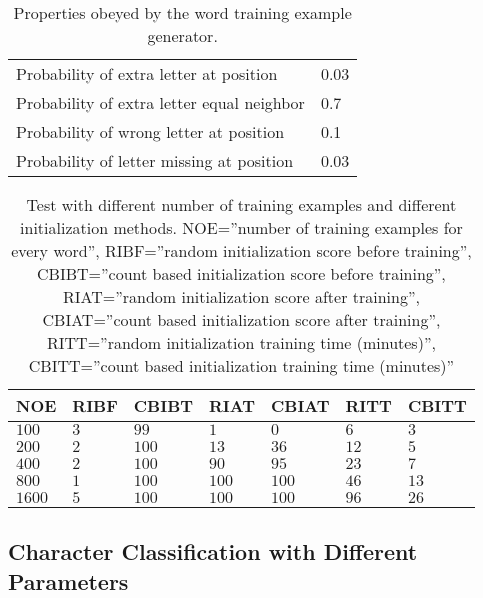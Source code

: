 \begin{table}[htb]
  \begin{center}
  \begin{tabular}{ l l }
    Probability of extra letter at position         & 0.03 \\
    Probability of extra letter equal neighbor      & 0.7 \\ 
    Probability of wrong letter at position         & 0.1 \\ 
    Probability of letter missing at position       & 0.03 \\
  \end{tabular}
\end{center}
\caption{Properties obeyed by the word training example generator.} 
\label{tab:word_generator_properties} 
\end{table}

\begin{table}[htb]
  \begin{center}
  \begin{tabular}{ l l l l l l l }
    NOE    & RIBF   & CBIBT  & RIAT    & CBIAT  & RITT & CBITT\\ \hline
    $100$  & $3$ & $99$   & $1$     & $0$    & $6$  & $3$\\ 
    $200$  & $2$ & $100$  & $13$    & $36$   & $12$ & $5$\\ 
    $400$  & $2$ & $100$  & $90$    & $95$   & $23$ & $7$\\
    $800$  & $1$ & $100$  & $100$   & $100$  & $46$ & $13$\\   
    $1600$ & $5$ & $100$  & $100$   & $100$  & $96$ & $26$\\  
  \end{tabular}
\end{center}
\caption{Test with different number of training examples and different initialization methods.
	 NOE=''number of training examples for every word'',
         RIBF=''random initialization score before training'',
         CBIBT=''count based initialization score before training'',
         RIAT=''random initialization score after training'',
         CBIAT=''count based initialization score after training'',
         RITT=''random initialization training time (minutes)'',
         CBITT=''count based initialization training time (minutes)''} 
\label{tab:word_classifier_results_generated_data} 
\end{table}

\subsection{Character Classification with Different Parameters}\label{sec:character_classifier_results}

